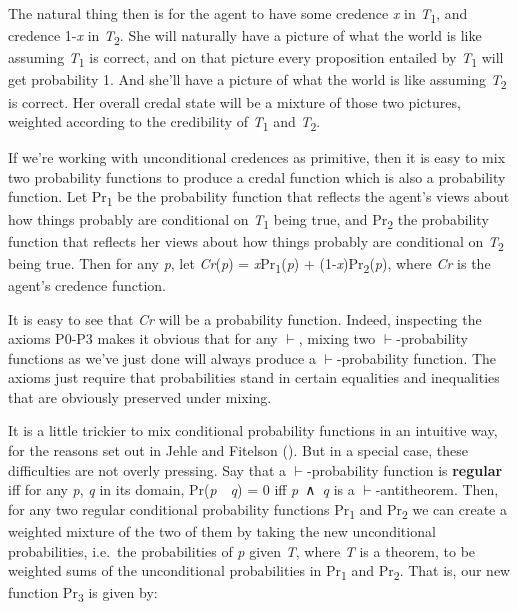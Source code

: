 \documentclass[
  11pt,
  letterpaper,
  DIV=11,
  numbers=noendperiod,
  twoside]{scrartcl}
\begin{document}
The natural thing then is for the agent to have some credence \emph{x}
in \emph{T}\textsubscript{1}, and credence 1-\emph{x} in
\emph{T}\textsubscript{2}. She will naturally have a picture of what the
world is like assuming \emph{T}\textsubscript{1} is correct, and on that
picture every proposition entailed by \emph{T}\textsubscript{1} will get
probability 1. And she'll have a picture of what the world is like
assuming \emph{T}\textsubscript{2} is correct. Her overall credal state
will be a mixture of those two pictures, weighted according to the
credibility of \emph{T}\textsubscript{1} and \emph{T}\textsubscript{2}.

If we're working with unconditional credences as primitive, then it is
easy to mix two probability functions to produce a credal function which
is also a probability function. Let Pr\textsubscript{1} be the
probability function that reflects the agent's views about how things
probably are conditional on \emph{T}\textsubscript{1} being true, and
Pr\textsubscript{2} the probability function that reflects her views
about how things probably are conditional on \emph{T}\textsubscript{2}
being true. Then for any \emph{p}, let \emph{Cr}(\emph{p}) =
\emph{x}Pr\textsubscript{1}(\emph{p}) +
(1-\emph{x})Pr\textsubscript{2}(\emph{p}), where \emph{Cr} is the
agent's credence function.

It is easy to see that \emph{Cr} will be a probability function. Indeed,
inspecting the axioms P0-P3 makes it obvious that for any \(\vdash\),
mixing two \(\vdash\)-probability functions as we've just done will
always produce a \(\vdash\)-probability function. The axioms just
require that probabilities stand in certain equalities and inequalities
that are obviously preserved under mixing.

It is a little trickier to mix conditional probability functions in an
intuitive way, for the reasons set out in Jehle and Fitelson
(). But in a special case, these
difficulties are not overly pressing. Say that a \(\vdash\)-probability
function is \textbf{regular} iff for any \emph{p}, \emph{q} in its
domain, Pr(\emph{p}~\textbar~\emph{q}) = 0 iff \emph{p}~∧~\emph{q} is a
\(\vdash\)-antitheorem. Then, for any two regular conditional
probability functions Pr\textsubscript{1} and Pr\textsubscript{2} we can
create a weighted mixture of the two of them by taking the new
unconditional probabilities, i.e.~the probabilities of \emph{p} given
\emph{T}, where \emph{T} is a theorem, to be weighted sums of the
unconditional probabilities in Pr\textsubscript{1} and
Pr\textsubscript{2}. That is, our new function Pr\textsubscript{3} is
given by:
\end{document}
